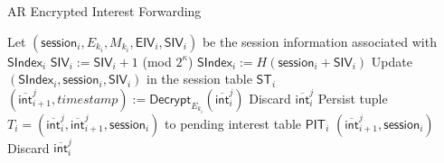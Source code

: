 \documentclass[10pt]{article}
\begin{document}
\begin{algorithm}[ht!]
  \caption{AR Encrypted Interest Forwarding}
  \begin{algorithmic}[1]
  \State Let $(\mathsf{session}_i, E_{k_i}, M_{k_i}, \mathsf{EIV}_i, \mathsf{SIV}_i)$ be the session information associated with $\mathsf{SIndex}_i$
  \State $\mathsf{SIV}_i := \mathsf{SIV}_i + 1$ (mod $2^{\kappa}$)
  \State $\mathsf{SIndex}_i := H(\mathsf{session}_i + \mathsf{SIV}_i)$
  \State Update $(\mathsf{SIndex}_i, \mathsf{session}_i, \mathsf{SIV}_i)$ in the session table $\mathsf{ST}_i$
  \State $(\overline{\mathsf{int}}_{i+1}^{j}, timestamp) := \mathsf{Decrypt}_{E_{k_i}}(\overline{\mathsf{int}}_{i}^{j})$
    \State Discard $\overline{\mathsf{int}}_{i}^{j}$
  \Else
    \State Persist tuple $T_i = (\overline{\mathsf{int}}_{i}^{j}, \overline{\mathsf{int}}_{i+1}^{j}, \mathsf{session}_i)$ to pending interest table $\mathsf{PIT}_i$
    \State \Return $(\overline{\mathsf{int}}_{i+1}^{j}, \mathsf{session}_i)$
  \EndIf
\Else
  \State Discard $\overline{\mathsf{int}}_{i}^{j}$ 
\EndIf
\end{algorithmic}
\label{alg:enc_int_forward}
\end{algorithm}
\end{document}
